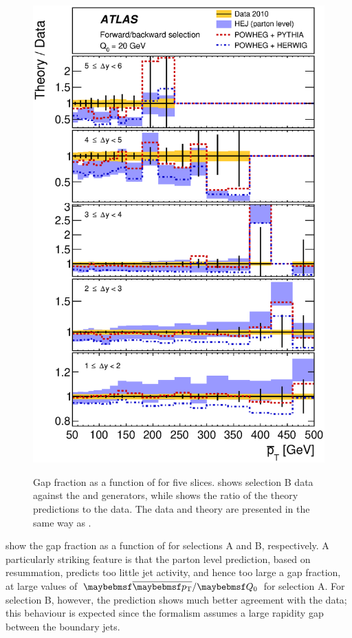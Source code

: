 \begin{figure}[htpb]
{    \includegraphics[width=\smallfigwidth]{chapters/gbj/GapFraction_PtBarDist_gap_Q0_sel_B_Ratio.eps}
    \label{fig:gbj:Gap_fraction_pTbar_B_ratio}}
  \caption{Gap fraction as a function of \pTbar for five \DeltaY slices. \protect{}
           shows selection B data against the \HEJ and \Powheg generators, while \protect{}
           shows the ratio of the theory predictions to the data. The data and theory
           are presented in the same way as .}
  \label{fig:gbj:Gap_fraction_pTbar_B}
\end{figure}

 show the
gap fraction as a function of \pTbar for selections A and B, respectively. A particularly striking feature
is that the parton level \HEJ prediction, based on \BFKL resummation, predicts too
little jet activity, and hence too large a gap fraction, at large values of $\pTbar / \Qnought$
for selection A. For selection B, however, the \HEJ prediction shows much better
agreement with the data; this behaviour is expected since the \HEJ formalism assumes
a large rapidity gap between the boundary jets.

